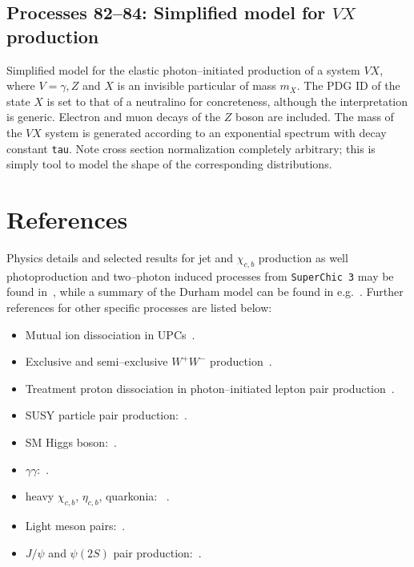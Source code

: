 \documentclass[12pt]{article}
\begin{document}
\subsection{Processes 82--84: Simplified model for $VX$ production}

Simplified model for the elastic photon--initiated production of a system $VX$, where $V=\gamma,Z$ and $X$ is an invisible particular of mass $m_X$. The PDG ID of the state $X$ is set to that of a neutralino for concreteness, although the interpretation is generic. Electron and muon decays of the $Z$ boson are included. The mass of the $VX$ system is generated according to an exponential spectrum with decay constant \texttt{tau}. Note cross section normalization completely arbitrary; this is simply tool to model the shape of the corresponding distributions.

\section{References}\label{sec:ref}



Physics details and selected results for jet and $\chi_{c,b}$ production as well photoproduction and two--photon induced processes from \texttt{SuperChic 3} may be found in~\cite{Harland-Lang:2015cta}, while a summary of the Durham model can be found in e.g.~\cite{Harland-Lang:2014dta,Harland-Lang:2014lxa,Harland-Lang:2015eqa}. 
Further references for other specific processes are listed below:
\begin{itemize}
\item Mutual ion dissociation in UPCs~\cite{Harland-Langiondiss}.
\item Exclusive and semi--exclusive $W^+ W^-$ production~\cite{Bailey:2022wqy}.
\item Treatment proton dissociation in photon–initiated lepton pair production~\cite{Harland-Lang:2020veo}.
\item SUSY particle pair production:~\cite{Harland-Lang:2018hmi}.
\item SM Higgs boson:~\cite{HarlandLang:2013jf}.
\item $\gamma\gamma$:~\cite{HarlandLang:2010ep,HarlandLang:2012qz}.
\item heavy $\chi_{c,b}$, $\eta_{c,b}$, quarkonia: ~\cite{HarlandLang:2009qe,HarlandLang:2010ep,HarlandLang:2010ys}. 
\item Light meson pairs:~\cite{HarlandLang:2011qd,Harland-Lang:2013ncy,Harland-Lang:2013qia}.
\item $J/\psi$ and $\psi(2S)$ pair production:~\cite{Harland-Lang:2014efa}.
\end{itemize}
\end{document}
